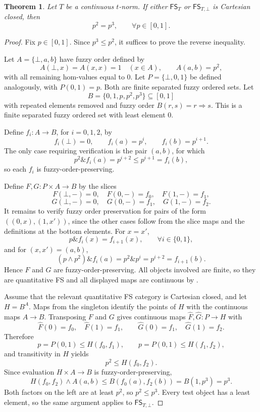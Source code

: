 \documentclass[preprint,3p,times]{elsarticle}
\newtheorem{theorem}{Theorem}[section]
\theoremstyle{definition}
\theoremstyle{remark}
\newcommand{\FS}{\mathsf{FS}}
\newcommand{\tn}{\mathbin{\&}}
\numberwithin{equation}{section}
\begin{document}
\begin{theorem}\label{thm:cartesian-necessity}
Let \(T\) be a continuous \(t\)-norm. If either \(\FS_T\) or \(\FS_{T,\bot}\) is Cartesian closed, then
\[
 p^2=p^3,
 \qquad \forall p\in[0,1].
\]
\end{theorem}

\begin{proof}
Fix \(p\in[0,1]\). Since \(p^3\leq p^2\), it suffices to prove the reverse inequality.

Let \(A=\{\bot,a,b\}\) have fuzzy order defined by
\[
 A(\bot,x)=A(x,x)=1 \quad (x\in A),
 \qquad A(a,b)=p^2,
\]
with all remaining hom-values equal to \(0\). Let \(P=\{\bot,0,1\}\) be defined analogously, with \(P(0,1)=p\). Both are finite separated fuzzy ordered sets. Let
\[
 B=\{0,1,p,p^2,p^3\}\subseteq[0,1]
\]
with repeated elements removed and fuzzy order \(B(r,s)=r\Rightarrow s\). This is a finite separated fuzzy ordered set with least element \(0\).

Define \(f_i\colon A\to B\), for \(i=0,1,2\), by
\[
 f_i(\bot)=0,
 \qquad
 f_i(a)=p^i,
 \qquad
 f_i(b)=p^{i+1}.
\]
The only case requiring verification is the pair \((a,b)\), for which
\[
 p^2\tn f_i(a)=p^{i+2}\leq p^{i+1}=f_i(b),
\]
so each \(f_i\) is fuzzy-order-preserving.

Define \(F,G\colon P\times A\to B\) by the slices
\[
 F(\bot,-)=0,
 \quad F(0,-)=f_0,
 \quad F(1,-)=f_1,
\]
\[
 G(\bot,-)=0,
 \quad G(0,-)=f_1,
 \quad G(1,-)=f_2.
\]
It remains to verify fuzzy order preservation for pairs of the form \(((0,x),(1,x'))\), since the other cases follow from the slice maps and the definitions at the bottom elements. For \(x=x'\),
\[
 p\tn f_i(x)=f_{i+1}(x),
 \qquad \forall i\in\{0,1\},
\]
and for \((x,x')=(a,b)\),
\[
 (p\wedge p^2)\tn f_i(a)=p^2\tn p^i=p^{i+2}=f_{i+1}(b).
\]
Hence \(F\) and \(G\) are fuzzy-order-preserving. All objects involved are finite, so they are quantitative FS and all displayed maps are continuous by .

Assume that the relevant quantitative FS category is Cartesian closed, and let \(H=B^A\). Maps from the singleton identify the points of \(H\) with the continuous maps \(A\to B\). Transposing \(F\) and \(G\) gives continuous maps \(\widehat F,\widehat G\colon P\to H\) with
\[
 \widehat F(0)=f_0,
 \quad \widehat F(1)=f_1,
 \qquad
 \widehat G(0)=f_1,
 \quad \widehat G(1)=f_2.
\]
Therefore
\[
 p=P(0,1)\leq H(f_0,f_1),
 \qquad
 p=P(0,1)\leq H(f_1,f_2),
\]
and transitivity in \(H\) yields
\[
 p^2\leq H(f_0,f_2).
\]
Since evaluation \(H\times A\to B\) is fuzzy-order-preserving,
\[
 H(f_0,f_2)\wedge A(a,b)
 \leq B(f_0(a),f_2(b))
 =B(1,p^3)=p^3.
\]
Both factors on the left are at least \(p^2\), so \(p^2\leq p^3\). Every test object has a least element, so the same argument applies to \(\FS_{T,\bot}\).
\end{proof}
\end{document}
